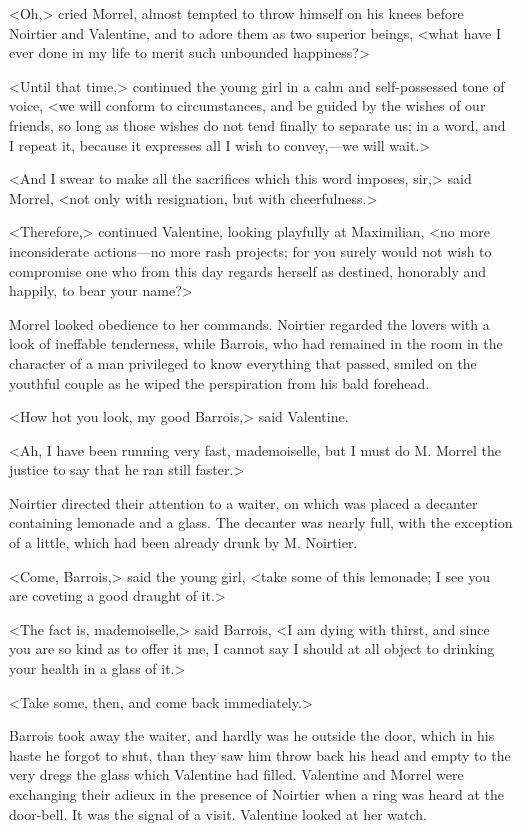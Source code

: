  <Oh,> cried Morrel, almost tempted to throw himself on his knees before Noirtier and Valentine, and to adore them as two superior beings, <what have I ever done in my life to merit such unbounded happiness?> 

 <Until that time,> continued the young girl in a calm and self-possessed tone of voice, <we will conform to circumstances, and be guided by the wishes of our friends, so long as those wishes do not tend finally to separate us; in a word, and I repeat it, because it expresses all I wish to convey,—we will wait.> 

 <And I swear to make all the sacrifices which this word imposes, sir,> said Morrel, <not only with resignation, but with cheerfulness.> 

 <Therefore,> continued Valentine, looking playfully at Maximilian, <no more inconsiderate actions—no more rash projects; for you surely would not wish to compromise one who from this day regards herself as destined, honorably and happily, to bear your name?> 

 Morrel looked obedience to her commands. Noirtier regarded the lovers with a look of ineffable tenderness, while Barrois, who had remained in the room in the character of a man privileged to know everything that passed, smiled on the youthful couple as he wiped the perspiration from his bald forehead. 

 <How hot you look, my good Barrois,> said Valentine. 

 <Ah, I have been running very fast, mademoiselle, but I must do M. Morrel the justice to say that he ran still faster.> 

 Noirtier directed their attention to a waiter, on which was placed a decanter containing lemonade and a glass. The decanter was nearly full, with the exception of a little, which had been already drunk by M. Noirtier. 

 <Come, Barrois,> said the young girl, <take some of this lemonade; I see you are coveting a good draught of it.> 

 <The fact is, mademoiselle,> said Barrois, <I am dying with thirst, and since you are so kind as to offer it me, I cannot say I should at all object to drinking your health in a glass of it.> 

 <Take some, then, and come back immediately.> 

 Barrois took away the waiter, and hardly was he outside the door, which in his haste he forgot to shut, than they saw him throw back his head and empty to the very dregs the glass which Valentine had filled. Valentine and Morrel were exchanging their adieux in the presence of Noirtier when a ring was heard at the door-bell. It was the signal of a visit. Valentine looked at her watch. 

